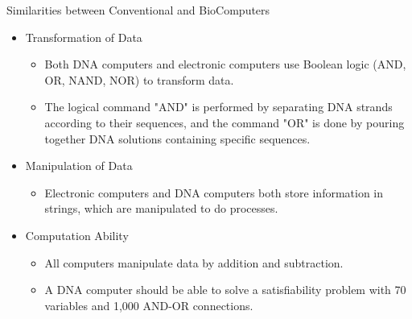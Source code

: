 \documentclass[10pt]{beamer}
\begin{document}
\begin{frame}{Similarities between Conventional and BioComputers}
  \begin{itemize}
        \item {Transformation of Data
          \begin{itemize}
        \item Both DNA computers and electronic computers use Boolean logic (AND, OR, NAND, NOR) to transform data.
                \item The logical command "AND" is performed by separating DNA strands according to their sequences, and the command "OR" is done by pouring together DNA solutions containing specific sequences.
      \end{itemize}
            }
             \item {Manipulation of Data
          \begin{itemize}
        \item Electronic computers and DNA computers both store information in strings, which are manipulated to do processes. 
      \end{itemize}
            }
            \item {Computation Ability
              \begin{itemize}
          \item All computers manipulate data by addition and subtraction. 
                    \item A DNA computer should be able to solve a satisfiability problem with 70 variables and 1,000 AND-OR connections. 
        \end{itemize}
            }
  \end{itemize}
\end{frame}
\end{document}
